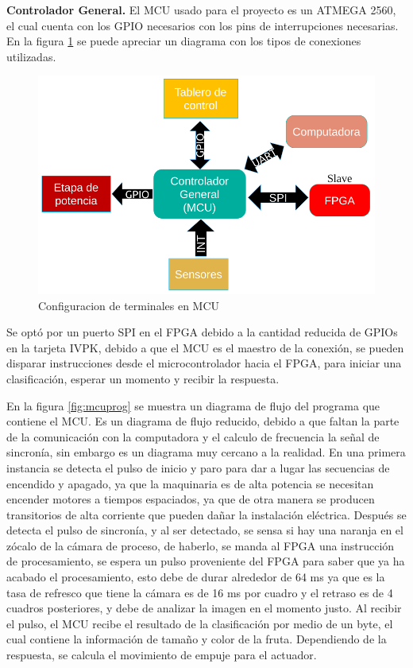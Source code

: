 \documentclass[twoside,spanish,ESP,MSc]{plantillaLabUPV}
\theoremstyle{definition}
\begin{document}
\checkmark\textbf{Controlador General.} El MCU usado para el proyecto es un ATMEGA 2560, el cual cuenta con los GPIO necesarios con los pins de interrupciones necesarias. En la figura \ref{fig:pins} se puede apreciar un diagrama con los tipos de conexiones utilizadas.

\begin{figure}
	\centering
	\includegraphics[width=0.7\linewidth]{edrawimas/pins}
	\caption{Configuracion de terminales en MCU}
	\label{fig:pins}
\end{figure}

Se optó por un puerto SPI en el FPGA debido a la cantidad reducida de GPIOs en la tarjeta IVPK, debido a que el MCU es el maestro de la conexión, se pueden disparar instrucciones desde el microcontrolador hacia el FPGA, para iniciar una clasificación, esperar un momento y recibir la respuesta.

En la figura \ref{fig:mcuprog} se muestra un diagrama de flujo del programa que contiene el MCU. Es un diagrama de flujo reducido, debido a que faltan la parte de la comunicación con la computadora y el calculo de frecuencia la señal de sincronía, sin embargo es un diagrama muy cercano a la realidad. En una primera instancia se detecta el pulso de inicio y paro para dar a lugar las secuencias de encendido y apagado, ya que la maquinaria es de alta potencia se necesitan encender motores a tiempos espaciados, ya que de otra manera se producen transitorios de alta corriente que pueden dañar la instalación eléctrica. Después se detecta el pulso de sincronía, y al ser detectado, se sensa si hay una naranja en el zócalo de la cámara de proceso, de haberlo, se manda al FPGA una instrucción de procesamiento, se espera un pulso proveniente del FPGA para saber que ya ha acabado el procesamiento, esto debe de durar alrededor de 64 ms ya que es la tasa de refresco que tiene la cámara es de 16 ms por cuadro y el retraso es de 4 cuadros posteriores, y debe de analizar la imagen en el momento justo. Al recibir el pulso, el MCU recibe el resultado de la clasificación por medio de un byte, el cual contiene la información de tamaño y color de la fruta. Dependiendo de la respuesta, se calcula el movimiento de empuje para el actuador.
\end{document}
